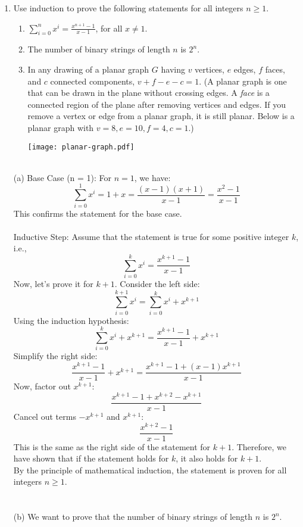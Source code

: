 \documentclass[11pt]{exam}
\begin{document}
\begin{enumerate}
  \item 
  Use induction to prove the following statements for all integers $n \geq 1$.
  \begin{enumerate}
      \item $\sum_{i=0}^n x^i = \frac{x^{n+1}-1}{x-1}$, for all $x \neq 1$.
      \item The number of binary strings of length $n$ is $2^{n}$.
      \item In any drawing of a planar graph $G$ having $v$ vertices, $e$ edges, $f$ faces, and $c$ connected components, $v+f-e-c=1$.  (A planar graph is one that can be drawn in the plane without crossing edges. A \emph{face} is a connected region of the plane after removing vertices and edges.
      If you remove a vertex or edge from a planar graph, it is still planar. Below is a planar graph with $v=8,e=10,f=4,c=1$.)
\medskip

\centerline{\texttt{[image: planar-graph.pdf]}}
  \end{enumerate}
    
    \begin{solution}      
\\ (a) Base Case (n = 1): For $n = 1$, we have:
\[
\sum_{i=0}^{1} x^i = 1 + x = \frac{(x - 1)(x + 1)}{x-1}= \frac{x^2 - 1}{x - 1}
\]
This confirms the statement for the base case.\\
\\ Inductive Step: Assume that the statement is true for some positive integer $k$, i.e.,
\[
\sum_{i=0}^{k} x^i = \frac{x^{k+1} - 1}{x - 1}
\]
Now, let's prove it for $k + 1$. Consider the left side:
\[
\sum_{i=0}^{k+1} x^i = \sum_{i=0}^{k} x^i + x^{k+1}
\]
Using the induction hypothesis:
\[
\sum_{i=0}^{k} x^i + x^{k+1} = \frac{x^{k+1} - 1}{x - 1} + x^{k+1}
\]
Simplify the right side:
\[
\frac{x^{k+1} - 1}{x - 1} + x^{k+1} = \frac{x^{k+1} - 1 + (x - 1)x^{k+1}}{x - 1}
\]
Now, factor out $x^{k+1}$:
\[
\frac{x^{k+1} - 1 + x^{k+2} - x^{k+1}}{x - 1}
\]
Cancel out terms $-x^{k+1}$ and $x^{k+1}$:
\[
\frac{x^{k+2} - 1}{x - 1}
\]
This is the same as the right side of the statement for $k + 1$. Therefore, we have shown that if the statement holds for $k$, it also holds for $k + 1$.
\\By the principle of mathematical induction, the statement is proven for all integers $n \geq 1$.
\\
\\
\\ (b)
We want to prove that the number of binary strings of length $n$ is $2^n$.


\end{solution}
\end{enumerate}
\end{document}
